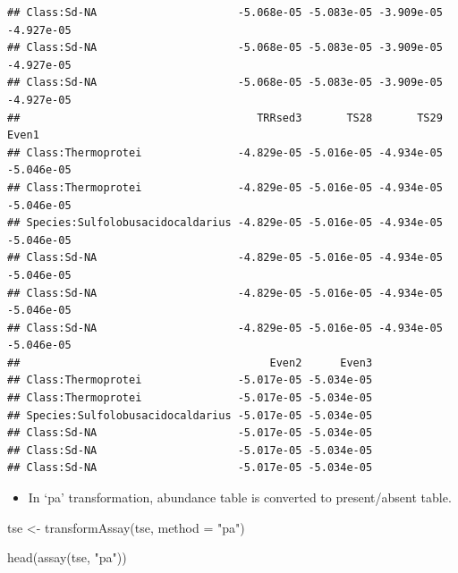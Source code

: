 \documentclass[
]{book}
\newenvironment{Shaded}{\begin{snugshade}}{\end{snugshade}}
\newcommand{\AttributeTok}[1]{\textcolor[rgb]{0.77,0.63,0.00}{#1}}
\newcommand{\FunctionTok}[1]{\textcolor[rgb]{0.00,0.00,0.00}{#1}}
\newcommand{\NormalTok}[1]{#1}
\newcommand{\OtherTok}[1]{\textcolor[rgb]{0.56,0.35,0.01}{#1}}
\newcommand{\StringTok}[1]{\textcolor[rgb]{0.31,0.60,0.02}{#1}}
\providecommand{\tightlist}{%
  \setlength{\itemsep}{0pt}\setlength{\parskip}{0pt}}
\begin{document}
\begin{verbatim}
## Class:Sd-NA                      -5.068e-05 -5.083e-05 -3.909e-05 -4.927e-05
## Class:Sd-NA                      -5.068e-05 -5.083e-05 -3.909e-05 -4.927e-05
## Class:Sd-NA                      -5.068e-05 -5.083e-05 -3.909e-05 -4.927e-05
##                                     TRRsed3       TS28       TS29      Even1
## Class:Thermoprotei               -4.829e-05 -5.016e-05 -4.934e-05 -5.046e-05
## Class:Thermoprotei               -4.829e-05 -5.016e-05 -4.934e-05 -5.046e-05
## Species:Sulfolobusacidocaldarius -4.829e-05 -5.016e-05 -4.934e-05 -5.046e-05
## Class:Sd-NA                      -4.829e-05 -5.016e-05 -4.934e-05 -5.046e-05
## Class:Sd-NA                      -4.829e-05 -5.016e-05 -4.934e-05 -5.046e-05
## Class:Sd-NA                      -4.829e-05 -5.016e-05 -4.934e-05 -5.046e-05
##                                       Even2      Even3
## Class:Thermoprotei               -5.017e-05 -5.034e-05
## Class:Thermoprotei               -5.017e-05 -5.034e-05
## Species:Sulfolobusacidocaldarius -5.017e-05 -5.034e-05
## Class:Sd-NA                      -5.017e-05 -5.034e-05
## Class:Sd-NA                      -5.017e-05 -5.034e-05
## Class:Sd-NA                      -5.017e-05 -5.034e-05
\end{verbatim}

\begin{itemize}
\tightlist
\item
  In `pa' transformation, abundance table is converted to present/absent table.
\end{itemize}

\begin{Shaded}
\begin{Highlighting}[]
\NormalTok{tse }\OtherTok{\textless{}{-}} \FunctionTok{transformAssay}\NormalTok{(tse, }\AttributeTok{method =} \StringTok{"pa"}\NormalTok{)}

\FunctionTok{head}\NormalTok{(}\FunctionTok{assay}\NormalTok{(tse, }\StringTok{"pa"}\NormalTok{))}
\end{Highlighting}
\end{Shaded}
\end{document}
